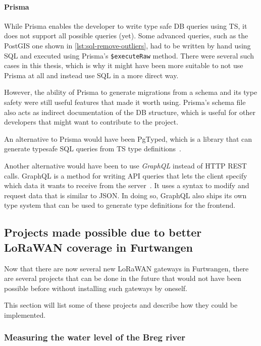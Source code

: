 \paragraph{Prisma}

While Prisma enables the developer to write type safe \ac{DB} queries using \ac{TS}, it does not support all possible queries (yet).
Some advanced queries, such as the PostGIS one shown in \cref{lst:sql-remove-outliers}, had to be written by hand using \ac{SQL} and executed using Prisma's \lstinline|$executeRaw| method.
There were several such cases in this thesis, which is why it might have been more suitable to not use Prisma at all and instead use \ac{SQL} in a more direct way.

However, the ability of Prisma to generate migrations from a schema and its type safety were still useful features that made it worth using.
Prisma's schema file also acts as indirect documentation of the \ac{DB} structure, which is useful for other developers that might want to contribute to the project.

An alternative to Prisma would have been PgTyped, which is a library that can generate typesafe \ac{SQL} queries from \ac{TS} type definitions~\cite{salakh_pgtyped_2023}.

Another alternative would have been to use \emph{GraphQL} instead of \ac{HTTP} \ac{REST} calls.
GraphQL is a method for writing \ac{API} queries that lets the client specify which data it wants to receive from the server~\cite{graphql_foundation_graphql_2023}.
It uses a syntax to modify and request data that is similar to \ac{JSON}.
In doing so, GraphQL also ships its own type system that can be used to generate type definitions for the frontend.

\subsection{Projects made possible due to better \acs{LoRaWAN} coverage in Furtwangen}

Now that there are now several new \ac{LoRaWAN} gateways in Furtwangen, there are several projects that can be done in the future that would not have been possible before without installing such gateways by oneself.

This section will list some of these projects and describe how they could be implemented.

\subsubsection{Measuring the water level of the Breg river}

